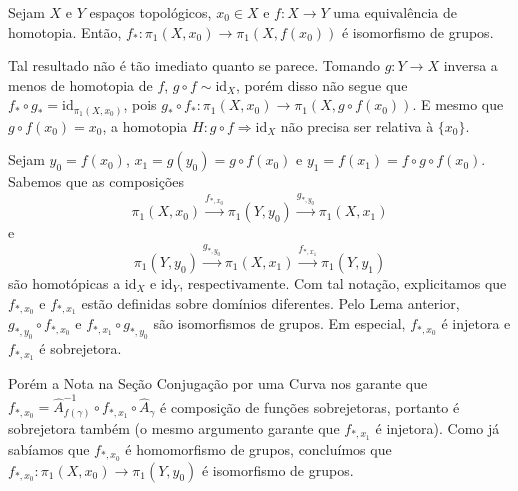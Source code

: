 \begin{thm}
    Sejam $X$ e $Y$ espaços topológicos, $x_0\in X$ e $f:X\to Y$ uma equivalência de homotopia. Então, $f_*: \pi_1(X,x_0) \to \pi_1(X,f(x_0))$ é isomorfismo de grupos.
\end{thm}

Tal resultado não é tão imediato quanto se parece. Tomando $g: Y\to X$ inversa a menos de homotopia de $f$, $g \circ f \sim \text{id}_X$, porém disso não segue que $f_* \circ g_* = \text{id}_{\pi_1(X,x_0)}$, pois $g_* \circ f_*: \pi_1(X,x_0) \to \pi_1(X,g\circ f(x_0))$. E mesmo que $g\circ f(x_0) = x_0$, a homotopia $H: g\circ f\Rightarrow \text{id}_X$ não precisa ser relativa à $\{x_0\}$.

\begin{dem}
    Sejam $y_0 = f(x_0)$, $x_1 = g(y_0) = g\circ f(x_0)$ e $y_1 = f(x_1) = f\circ g\circ f(x_0)$. Sabemos que as composições
    \[\pi_1(X,x_0) \xrightarrow{f_{*,x_0}} \pi_1(Y,y_0) \xrightarrow{g_{*,y_0}}\pi_1(X,x_1)\]
    e
    \[\pi_1(Y,y_0) \xrightarrow{g_{*,y_0}} \pi_1(X,x_1) \xrightarrow{f_{*,x_1}}\pi_1(Y,y_1)\]
    são homotópicas a $\text{id}_X$ e $\text{id}_Y$, respectivamente. Com tal notação, explicitamos que $f_{*,x_0}$ e $f_{*,x_1}$ estão definidas sobre domínios diferentes. Pelo Lema anterior, $g_{*,y_0}\circ f_{*,x_0}$ e $f_{*,x_1}\circ g_{*,y_0}$ são isomorfismos de grupos. Em especial, $f_{*,x_0}$ é injetora e $f_{*,x_1}$ é sobrejetora.

    Porém a Nota na Seção Conjugação por uma Curva nos garante que $f_{*,x_0} = \hat{A}_{f(\gamma)}^{-1} \circ f_{*,x_1} \circ \hat{A}_{\gamma}$ é composição de funções sobrejetoras, portanto é sobrejetora também (o mesmo argumento garante que $f_{*,x_1}$ é injetora). Como já sabíamos que $f_{*,x_0}$ é homomorfismo de grupos, concluímos que $f_{*,x_0}:\pi_1(X,x_0)\to \pi_1(Y,y_0)$ é isomorfismo de grupos.
\end{dem}


